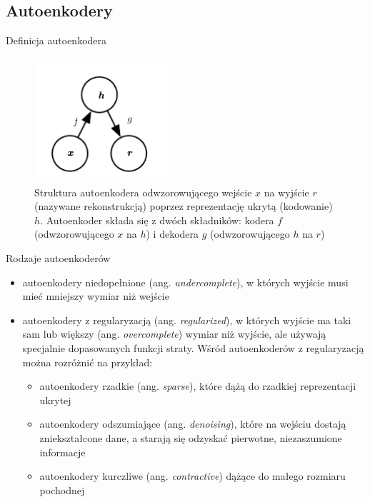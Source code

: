 \documentclass{beamer}
\theoremstyle{plain}
\theoremstyle{definition}
\theoremstyle{remark}
\newcommand\zrodlo[1]{\par\vspace{-3mm}{\tiny\textit{Źródło: }#1 }}
\begin{document}
\subsection{Autoenkodery}
\begin{frame}{Definicja autoenkodera}
	\begin{figure}[!h]
		\centering
		\includegraphics[width=5cm]{rys/autoencoder_structure.png}
		\caption{
			Struktura autoenkodera odwzorowującego wejście $x$ na wyjście $r$ (nazywane rekonstrukcją) poprzez reprezentację ukrytą (kodowanie) $h$. Autoenkoder składa się z dwóch składników: kodera $f$ (odwzorowującego $x$ na $h$) i dekodera $g$ (odwzorowującego $h$ na $r$)}
		\zrodlo{\cite{goodfellow}}
		\label{fig:autoencoder-structue}
	\end{figure}
\end{frame}
\begin{frame}{Rodzaje autoenkoderów}
	\begin{itemize}
		\item  autoenkodery niedopełnione (ang. \emph{undercomplete}), w których wyjście musi mieć mniejszy wymiar niż wejście
		\item autoenkodery z regularyzacją (ang. \emph{regularized}), w których wyjście ma taki sam lub większy (ang. \emph{overcomplete}) wymiar niż wyjście, ale używają specjalnie dopasowanych funkcji straty. Wśród autoenkoderów z regularyzacją można rozróżnić na przykład:
		\begin{itemize}
			\item autoenkodery rzadkie (ang. \emph{sparse}), które dążą do rzadkiej reprezentacji ukrytej
			\item autoenkodery odszumiające (ang. \emph{denoising}), które na wejściu dostają zniekształcone dane, a starają się odzyskać pierwotne, niezaszumione informacje
			\item autoenkodery kurczliwe (ang. \emph{contractive}) dążące do małego rozmiaru pochodnej
		\end{itemize}
	\end{itemize}
\end{frame}
\end{document}
